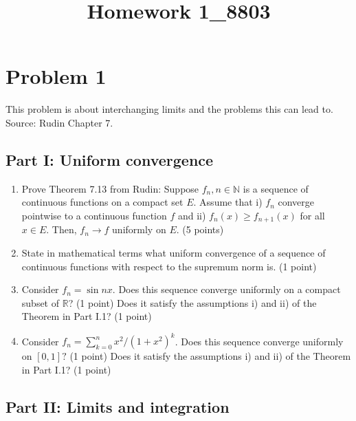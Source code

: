 \documentclass[12pt]{article}
\title{Homework 1_8803}
\begin{document}
\MakeScribeTop

\section*{Problem 1}
This problem is about interchanging limits and the problems this can lead to. Source: Rudin Chapter 7.

\subsection*{Part I: Uniform convergence}
\begin{enumerate}
	\item Prove Theorem 7.13 from Rudin: Suppose $f_n, n \in \mathbb{N}$ is a sequence of continuous functions on a compact set $E.$ Assume that i) $f_n$ converge pointwise to a continuous function $f$ and ii) $f_n(x) \geq f_{n+1}(x)$ for all $x \in E.$ Then, $f_n \to f$ uniformly on $E.$
 (5 points)
	\item State in mathematical terms what uniform convergence of a sequence of continuous functions with respect to the supremum norm is. (1 point)
	\item Consider $f_n = \sin nx$. Does this sequence converge uniformly on a compact subset of $\mathbb{R}$? (1 point) Does it satisfy the assumptions i) and ii) of the Theorem in Part I.1? (1 point)
	\item  Consider $f_n = \sum_{k=0}^n x^2/(1+x^2)^k$. Does this sequence converge uniformly on $[0,1]?$ (1 point) Does it satisfy the assumptions i) and ii) of the Theorem in Part I.1? (1 point)

\end{enumerate}

\subsection*{Part II: Limits and integration}
\end{document}
